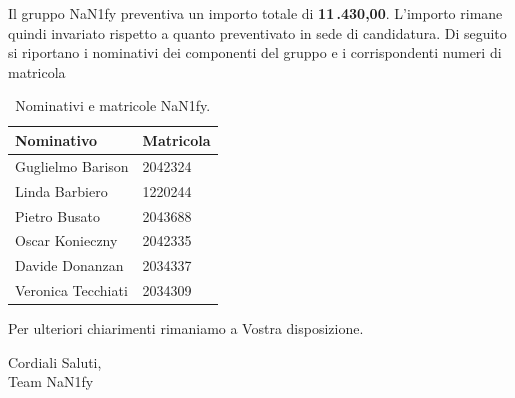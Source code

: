 \documentclass[8pt]{article}
\begin{document}
Il gruppo NaN1fy preventiva un importo totale di \textbf{11\,.430,00\;\texteuro}. L’importo rimane quindi invariato
rispetto a quanto preventivato in sede di candidatura.
\clearpage
Di seguito si riportano i nominativi dei componenti del gruppo e i corrispondenti numeri di matricola\\
\begin{table}[h!]
	\centering
	\begin{tabular}{p{3cm} p{3cm}}
		\toprule
		\textbf{Nominativo} & \textbf{Matricola} \\
		\midrule
		Guglielmo Barison & 2042324 \\
		Linda Barbiero &  1220244 \\
		Pietro Busato & 2043688 \\
		Oscar Konieczny & 2042335 \\
		Davide Donanzan & 2034337 \\
		Veronica Tecchiati & 2034309 \\
		\bottomrule
	\end{tabular}
	\caption{Nominativi e matricole NaN1fy.}
	\label{table:Nominativi e matricole NaN1fy}
\end{table}
Per ulteriori chiarimenti rimaniamo a Vostra disposizione.
\vspace{1em}
\begin{flushleft}
	Cordiali Saluti,\\
	Team NaN1fy
\end{flushleft}
\clearpage
\newpage
\justifying
\end{document}
